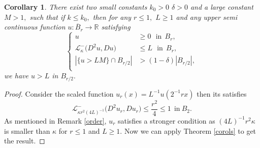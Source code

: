 \documentclass{amsart}
\theoremstyle{plain}
\newtheorem{corollary}[theorem]{Corollary}
\numberwithin{equation}{section}
\begin{document}
\begin{corollary}\label{scaler}
There exist two small constants $k_{0}>0$ $\delta>0$ and a large constant $M>1,$ such that if $k\leq k_{0},$ then for any $r\leq1,$ $L\geq 1$ and any upper semi continuous function $u:\overline{B}_{r}\longrightarrow\mathbb{R}$ satisfying 
\begin{equation*}
\left\{
\begin{aligned}
u&\geq0~~~\text{in}~~B_{r},\\
\mathcal{L}_{\kappa}^{-}\big(D^{2}u, Du\big)&\leq L~~~\text{in}~~B_{r},\\ 
|\{u>LM\}\cap B_{r/2}|&>(1-\delta)|B_{r/2}|,\\
\end{aligned}
\right.
\end{equation*}
we have $u>L$ in $B_{r/2}.$
\end{corollary}
\begin{proof}
Consider the scaled function $u_{r}(x)=L^{-1}u(2^{-1}rx)$ then its satisfies 
\[\mathcal{L}_{\kappa r^{2}(4L)^{-1}}^{-}\big(D^{2}u_{r},Du_{r}\big)\leq \frac{r^{2}}{4}\leq 1~~\text{in}~B_{2}.\]
As mentioned in Remark \ref{order}, $u_{r}$ satisfies a stronger condition as $(4L)^{-1}r^{2}\kappa$ is smaller than $\kappa$ for $r\leq 1$ and $L\geq 1.$ Now we can apply Theorem \ref{corols} to get the result.
\end{proof}
\end{document}
